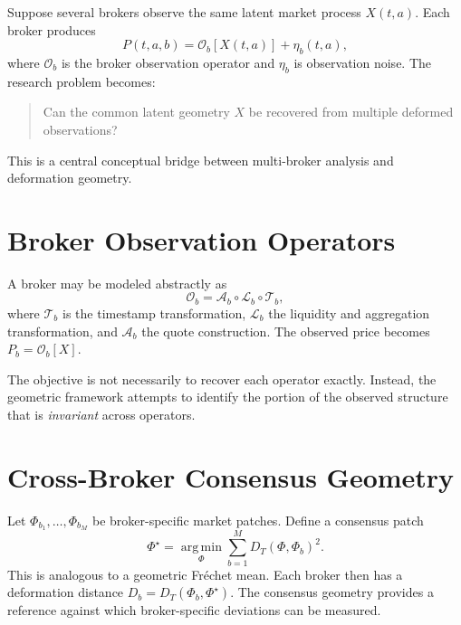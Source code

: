 \documentclass[11pt,a4paper]{article}
\numberwithin{equation}{section}
\newcommand{\argmin}{\operatorname*{arg\,min}}
\begin{document}
Suppose several brokers observe the same latent market process
$X(t,a)$. Each broker produces
\begin{equation}
P(t,a,b)=\mathcal{O}_b[X(t,a)]+\eta_b(t,a),
\end{equation}
where $\mathcal{O}_b$ is the broker observation operator and
$\eta_b$ is observation noise. The research problem becomes:
\begin{quote}
Can the common latent geometry $X$ be recovered from multiple
deformed observations?
\end{quote}
This is a central conceptual bridge between multi-broker analysis
and deformation geometry.

\section{Broker Observation Operators}\label{sec:brokerops}

A broker may be modeled abstractly as
\begin{equation}
\mathcal{O}_b=\mathcal{A}_b\circ\mathcal{L}_b\circ\mathcal{T}_b,
\end{equation}
where $\mathcal{T}_b$ is the timestamp transformation,
$\mathcal{L}_b$ the liquidity and aggregation transformation, and
$\mathcal{A}_b$ the quote construction. The observed price becomes
$P_b=\mathcal{O}_b[X]$.

The objective is not necessarily to recover each operator exactly.
Instead, the geometric framework attempts to identify the portion of
the observed structure that is \emph{invariant} across operators.

\section{Cross-Broker Consensus Geometry}\label{sec:consensus}

Let $\Phi_{b_1},\ldots,\Phi_{b_M}$ be broker-specific market
patches. Define a consensus patch
\begin{equation}
\Phi^\star=\argmin_\Phi\sum_{b=1}^{M}D_T(\Phi,\Phi_b)^2.
\label{eq:consensus}
\end{equation}
This is analogous to a geometric Fréchet mean. Each broker then has
a deformation distance $D_b=D_T(\Phi_b,\Phi^\star)$. The consensus
geometry provides a reference against which broker-specific
deviations can be measured.
\end{document}

